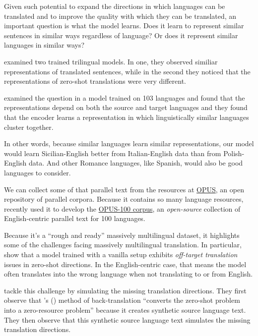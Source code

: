 \documentclass[10pt,letterpaper]{article}
\begin{document}
Given such potential to expand the directions in which languages can be translated and to improve 
the quality with which they can be translated, an important question is what the model learns.    
Does it learn to represent similar sentences in similar ways regardless of language?
Or does it represent similar languages in similar ways?
      
\citeauthor{johnson2017zeroshot} examined two trained trilingual models.
In one, they observed similiar representations of translated sentences,
while in the second they noticed that the representations of zero-shot translations were very different.
      
\citet{kudugunta2019investigating} examined the question in a model trained on 103 languages
and found that the representations depend on both the source and target languages
and they found that the encoder learns a representation in which 
linguistically similar languages cluster together.

In other words, because similar languages learn similar representations, our model would learn Sicilian-English 
better from Italian-English data than from Polish-English data.  And other Romance languages, like Spanish, would 
also be good languages to consider.

We can collect some of that parallel text from the resources at 
\href{http://opus.nlpl.eu/}{OPUS}, an open repository of parallel corpora.
Because it contains so many language resources,
\citet{zhang2020improving} recently used it to develop the 
\href{http://opus.nlpl.eu/opus-100.php}{OPUS-100 corpus}, an
\textit{open-source} collection of English-centric parallel text for 100 languages.

Because it's a ``rough and ready'' massively multilingual dataset, it highlights some of the challenges
facing massively multilingual translation.  In particular, \citeauthor{zhang2020improving}
show that a model trained with a vanilla setup exhibits \textit{off-target translation} issues
in zero-shot directions.  In the English-centric case, that means
the model often translates into	the wrong language when not translating to or from English.

\citeauthor{zhang2020improving} tackle this challenge by simulating the missing translation directions.
They first observe that \citeauthor{sennrich2015backtrans}'s (\citeyear{sennrich2015backtrans})
method of back-translation ``converts the zero-shot problem into a zero-resource problem''
because it creates synthetic source language text.  They then observe that this
synthetic source language text simulates the missing translation directions.
\end{document}
